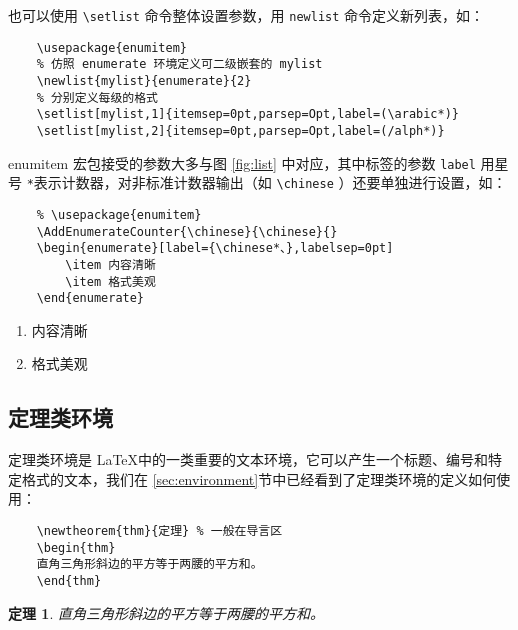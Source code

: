 也可以使用 \verb|\setlist| 命令整体设置参数，用 \verb|newlist| 命令定义新列表，如：

\begin{lstlisting}
    \usepackage{enumitem}
    % 仿照 enumerate 环境定义可二级嵌套的 mylist
    \newlist{mylist}{enumerate}{2}
    % 分别定义每级的格式
    \setlist[mylist,1]{itemsep=0pt,parsep=Opt,label=(\arabic*)}
    \setlist[mylist,2]{itemsep=0pt,parsep=Opt,label=(/alph*)}
\end{lstlisting}

enumitem 宏包接受的参数大多与图 \ref{fig:list} 中对应，其中标签的参数 \verb|label| 用星号 \verb|*|表示计数器，对非标准计数器输出（如 \verb|\chinese| ）还要单独进行设置，如：

\begin{lstlisting}
    % \usepackage{enumitem}
    \AddEnumerateCounter{\chinese}{\chinese}{}
    \begin{enumerate}[label={\chinese*、},labelsep=0pt]
        \item 内容清晰
        \item 格式美观
    \end{enumerate}
\end{lstlisting}

\AddEnumerateCounter{\chinese}{\chinese}{}
\begin{enumerate}[label={\chinese*、},labelsep=0pt]
    \item 内容清晰
    \item 格式美观
\end{enumerate}

\subsection{定理类环境}

定理类环境是 \LaTeX 中的一类重要的文本环境，它可以产生一个标题、编号和特定格式的文本，我们在 \ref{sec:environment}节中已经看到了定理类环境的定义如何使用：

\begin{minipage}[t]{0.45\textwidth}
\begin{lstlisting}
    \newtheorem{thm}{定理} % 一般在导言区
    \begin{thm}
    直角三角形斜边的平方等于两腰的平方和。
    \end{thm}
\end{lstlisting}
\end{minipage}
\hfill
\begin{minipage}[t]{0.45\textwidth}
    \newtheorem{thm}{定理}
    \begin{thm}
        直角三角形斜边的平方等于两腰的平方和。
    \end{thm}
\end{minipage}

